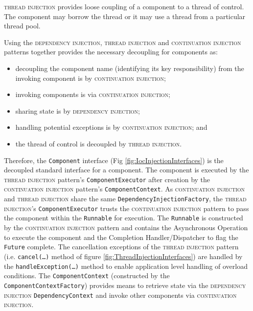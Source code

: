\documentclass[prodmode]{style/acmlarge}
\begin{document}
\textsc{thread injection} provides loose coupling of a component to a thread of
control.  The component may borrow the thread or it may use a thread from a
particular thread pool.

Using the \textsc{dependency injection}, \textsc{thread injection} and
\textsc{continuation injection} patterns together provides the necessary
decoupling for components as:
\begin{itemize}
  \item decoupling the component name (identifying its key responsibility) from the invoking component is by \textsc{continuation injection};
  \item invoking components is via \textsc{continuation injection};
  \item sharing state is by \textsc{dependency injection};
  \item handling potential exceptions is by \textsc{continuation injection}; and
  \item the thread of control is decoupled by \textsc{thread injection}.
\end{itemize}

Therefore, the \texttt{Component} interface (Fig
\ref{fig:IocInjectionInterfaces}) is the decoupled standard interface for a
component.  The component is executed by the \textsc{thread injection} pattern's
\texttt{ComponentExecutor} after creation by the \textsc{continuation injection}
pattern's \texttt{ComponentContext}.  As \textsc{continuation injection} and
\textsc{thread injection} share the same \texttt{DependencyInjectionFactory},
the \textsc{thread injection}'s \texttt{ComponentExecutor} trusts the
\textsc{continuation injection} pattern to pass the component within the
\texttt{Runnable} for execution.  The \texttt{Runnable} is constructed by the
\textsc{continuation injection} pattern and contains the Asynchronous Operation
to execute the component and the Completion Handler/Dispatcher to flag the
\texttt{Future} complete.  The cancellation exceptions of the \textsc{thread
injection} pattern (i.e. \texttt{cancel(\ldots)} method of figure
\ref{fig:ThreadInjectionInterfaces}) are handled by the
\texttt{handleException(\ldots)} method to enable application level handling of
overload conditions.  The \texttt{ComponentContext} (constructed by the
\texttt{ComponentContextFactory}) provides means to retrieve state via the
\textsc{dependency injection} \texttt{Dependency\-Context} and invoke other
components via \textsc{continuation injection}.
\end{document}
